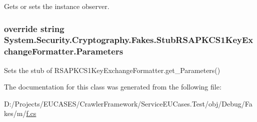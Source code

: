 Gets or sets the instance observer.

\hypertarget{class_system_1_1_security_1_1_cryptography_1_1_fakes_1_1_stub_r_s_a_p_k_c_s1_key_exchange_formatter_ad13dbd63166ee597e4a4dfa8f2cd449b}{
\subsubsection[{Parameters}]{\setlength{\rightskip}{0pt plus 5cm}override string System.\-Security.\-Cryptography.\-Fakes.\-Stub\-R\-S\-A\-P\-K\-C\-S1\-Key\-Exchange\-Formatter.\-Parameters\hspace{0.3cm}{\ttfamily [get]}}}\label{class_system_1_1_security_1_1_cryptography_1_1_fakes_1_1_stub_r_s_a_p_k_c_s1_key_exchange_formatter_ad13dbd63166ee597e4a4dfa8f2cd449b}


Sets the stub of R\-S\-A\-P\-K\-C\-S1\-Key\-Exchange\-Formatter.\-get\-\_\-\-Parameters()



The documentation for this class was generated from the following file\-:\begin{DoxyCompactItemize}
\item 
D\-:/\-Projects/\-E\-U\-C\-A\-S\-E\-S/\-Crawler\-Framework/\-Service\-E\-U\-Cases.\-Test/obj/\-Debug/\-Fakes/m/\hyperlink{m_2f_8cs}{f.\-cs}\end{DoxyCompactItemize}
